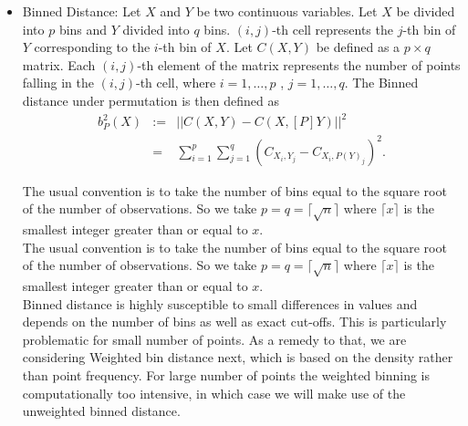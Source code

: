 \documentclass[12]{report}
\begin{document}
\begin{itemize}
\item Binned Distance:
Let $X$ and $Y$ be two continuous variables. Let $X$ be divided into $p$ bins and $Y$ divided into $q$ bins. $(i,j)$-th cell represents the $j$-th bin of $Y$ corresponding to the $i$-th bin of $X$. Let $C(X,Y)$ be defined as a $p \times q$ matrix. Each $(i,j)$-th element of the matrix represents the number of points falling in the $(i,j)$-th cell, where $i = 1, \dots, p$ , $j = 1, \dots, q$.
The Binned distance under permutation is then defined as
\begin{eqnarray*}
b^2_P(X) &:=& ||C(X,Y) - C(X,[P]Y)||^2 \\ &=& \sum_{i=1}^p \sum_{j=1}^q (C_{X_i,Y_j} - C_{X_i,P(Y)_j})^2.
\end{eqnarray*}

The usual convention is to take the number of bins equal to the square root of the number of observations. So we take $p = q = \lceil{\sqrt{n}} \rceil$ where $\lceil{x} \rceil$ is the smallest integer greater than or equal to $x$. \\

The usual convention is to take the number of bins equal to the square root of the number of observations. So we take $p = q = \lceil {\sqrt{n}}\rceil$ where $\lceil {x}\rceil$ is the smallest integer greater than or equal to $x$. \\

Binned distance is highly susceptible to small differences in values and depends on the number of bins as well as exact cut-offs. This is particularly problematic for small number of points. As a remedy to that, we are considering Weighted bin distance next, which is based on the density rather than point frequency. For large number of points the weighted binning is computationally too intensive, in which case we will make use of the unweighted  binned distance.



\end{itemize}
\end{document}

